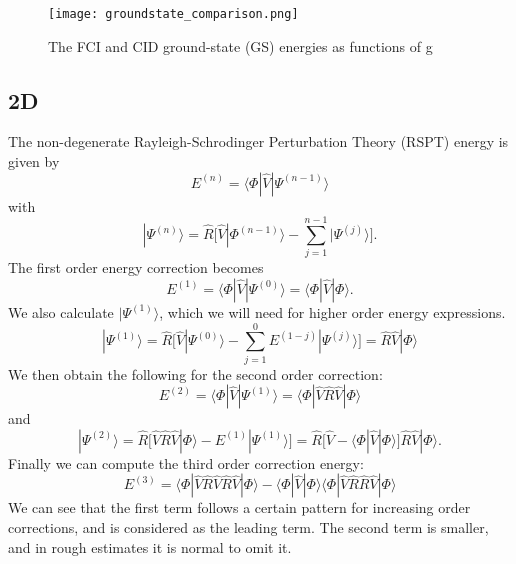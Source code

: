 \documentclass[norsk,a4paper,12pt]{article}
\begin{document}
\begin{figure}[H]
\centering
\texttt{[image: groundstate\_comparison.png]}
\caption{The FCI and CID ground-state (GS) energies as functions of g \label{fig:groundstate_comparison}}
\end{figure}



\subsection*{2D}
The non-degenerate Rayleigh-Schrodinger Perturbation Theory (RSPT) energy is given by
\begin{equation}
E^{(n)}=\langle \Phi|\hat{V}|\Psi^{(n-1)}\rangle
\end{equation}
with
\begin{equation}
|\Psi^{(n)}\rangle=\hat{R}\bigg[\hat{V}|\Phi^{(n-1)}\rangle-\sum_{j=1}^{n-1}|\Psi^{(j)}\rangle\bigg].
\end{equation}
The first order energy correction becomes
\begin{equation}
E^{(1)}=\langle\Phi|\hat{V}|\Psi^{(0)}\rangle=\langle\Phi|\hat{V}|\Phi\rangle.
\end{equation}
We also calculate $|\Psi^{(1)}\rangle$, which we will need for higher order energy expressions. 
\begin{equation}
|\Psi^{(1)}\rangle=\hat{R}\bigg[\hat{V}|\Psi^{(0)}\rangle-\sum_{j=1}^{0}E^{(1-j)}|\Psi^{(j)}\rangle\bigg]=\hat{R}\hat{V}|\Phi\rangle
\end{equation}
We then obtain the following for the second order correction:
\begin{equation}
E^{(2)}=\langle\Phi|\hat{V}|\Psi^{(1)}\rangle=\langle\Phi|\hat{V}\hat{R}\hat{V}|\Phi\rangle
\end{equation}
and
\begin{equation}
|\Psi^{(2)}\rangle=\hat{R}\bigg[\hat{V}\hat{R}\hat{V}|\Phi\rangle-E^{(1)}|\Psi^{(1)}\rangle\bigg]=\hat{R}\bigg[\hat{V}-\langle\Phi|\hat{V}|\Phi\rangle\bigg]\hat{R}\hat{V}|\Phi\rangle.
\end{equation}
Finally we can compute the third order correction energy:
\begin{equation}
E^{(3)}=\langle\Phi|\hat{V}\hat{R}\hat{V}\hat{R}\hat{V}|\Phi\rangle-\langle\Phi|\hat{V}|\Phi\rangle\langle\Phi|\hat{V}\hat{R}\hat{R}\hat{V}|\Phi\rangle
\end{equation}
We can see that the first term follows a certain pattern for increasing order corrections, and is considered as the leading term. The second term is smaller, and in rough estimates it is normal to omit it. 
\end{document}
